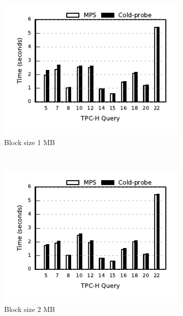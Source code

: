 \begin{figure}[ht]
	\centering
	\begin{subfigure}[ht]{0.3\textwidth}
		\includegraphics[width=\textwidth]{pipeline/figures/coldprobe-sequence-20threads-tpch-sf50-bs1mb-withlip-colstore}	
		\caption{Block size 1 MB}
	\end{subfigure}
	~
	\begin{subfigure}[ht]{0.3\textwidth}
		\includegraphics[width=\textwidth]{pipeline/figures/coldprobe-sequence-20threads-tpch-sf50-bs2mb-withlip-colstore}	
		\caption{Block size 2 MB}
	\end{subfigure}
	~
	\begin{subfigure}[ht]{0.3\textwidth}

\end{subfigure}
\end{figure}
